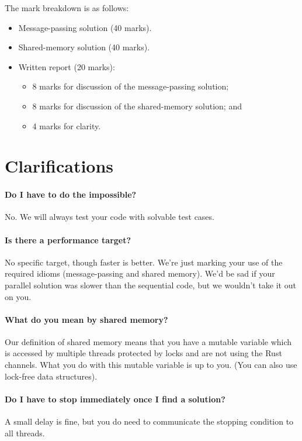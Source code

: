\documentclass[12pt]{article}
\renewcommand{\_}{\kern-1.5pt\textunderscore\kern-1.5pt}
\begin{document}
\vspace*{1em} \noindent
The mark breakdown is as follows:
\begin{itemize}[noitemsep]
  \item Message-passing solution (40 marks).
  \item Shared-memory solution (40 marks).
  \item Written report (20 marks):
\begin{itemize}[noitemsep]
	\item 8 marks for discussion of the message-passing solution;

	\item 8 marks for discussion of the shared-memory solution; and

	\item 4 marks for clarity.
\end{itemize}
\end{itemize}

\section*{Clarifications}

\paragraph{Do I have to do the impossible?} No. We will always test your code with solvable test cases.

\paragraph{Is there a performance target?} No specific target, though faster is better. We're just marking your use of the required idioms (message-passing and shared memory). We'd be sad if your parallel solution was slower than the sequential code, but we wouldn't take it out on you.

\paragraph{What do you mean by shared memory?} Our definition of shared memory means that you have a mutable variable which is accessed by multiple threads protected by locks and are not using the Rust channels. What you do with this mutable variable is up to you. (You can also use lock-free data structures).

\paragraph{Do I have to stop immediately once I find a solution?} A small delay is fine, but you do need to communicate the stopping condition to all threads.
\end{document}
